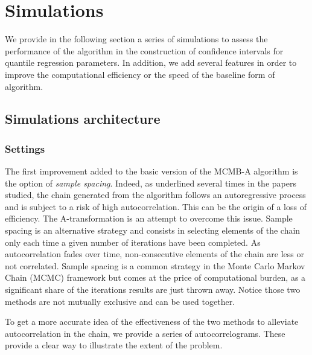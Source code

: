 \documentclass[11pt]{article}
\begin{document}
\section{Simulations}

We provide in the following section a series of simulations to assess the performance of the algorithm in the construction of confidence intervals for quantile regression parameters. In addition, we add several features in order to improve the computational efficiency or the speed of the baseline form of algorithm.\medskip


\subsection{Simulations architecture}

	\subsubsection{Settings}
	
The first improvement added to the basic version of the MCMB-A algorithm is the option of \textit{sample spacing}. Indeed, as underlined several times in the papers studied, the chain generated from the algorithm follows an autoregressive process and is subject to a risk of high autocorrelation. This can be the origin of a loss of efficiency. The A-transformation is an attempt to overcome this issue. Sample spacing is an alternative strategy and consists in selecting elements of the chain only each time a given number of iterations have been completed. As autocorrelation fades over time, non-consecutive elements of the chain are less or not correlated. Sample spacing is a common strategy in the Monte Carlo Markov Chain (MCMC) framework but comes at the price of computational burden, as a significant share of the iterations results are just thrown away. Notice those two methods are not mutually exclusive and can be used together.\smallskip

To get a more accurate idea of the effectiveness of the two methods to alleviate autocorrelation in the chain, we provide a series of autocorrelograms. These provide a clear way to illustrate the extent of the problem.\smallskip
\end{document}
